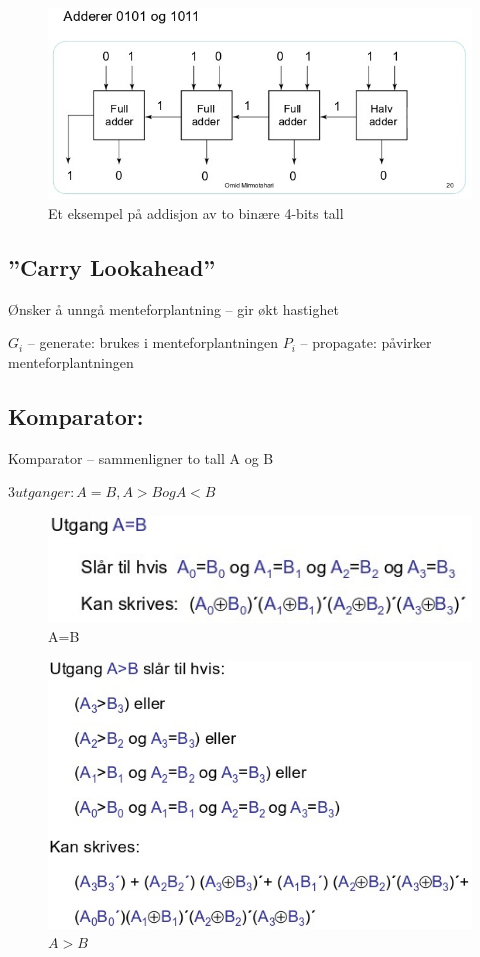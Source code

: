 \documentclass{article}
\begin{document}
	\begin{figure}[H]
		\includegraphics[scale = 0.6]{addeks.jpg}
		\caption{Et eksempel på addisjon av to binære 4-bits tall}
	\end{figure}
	
	\subsection*{”Carry Lookahead”}
	 Ønsker å unngå menteforplantning – gir økt hastighet
	 
	 $G_i$ – generate: brukes i menteforplantningen
	 $P_i$ – propagate: påvirker menteforplantningen
	
	\subsection*{Komparator:}
	Komparator – sammenligner to tall A og B 
	
	$3 utganger: A=B, A>B og A<B$
	
	\begin{figure}[H]
		\includegraphics[scale = 0.6]{komp1.jpg}
		\caption{A=B}
	\end{figure}
	
	
	\begin{figure}[H]
		\includegraphics[scale = 0.6]{komp2.jpg}
		\caption{$A>B$}
	\end{figure}
	
\end{document}
